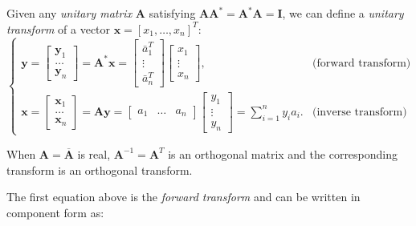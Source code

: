 \documentclass[10pt,b5paper,titlepage]{book}
\begin{document}
Given any \textit{unitary matrix} $\mathbf{A}$ satisfying $\mathbf{A} \mathbf{A}^{*} = \mathbf{A}^{*} \mathbf{A} = \mathbf{I}$, we can define a \textit{unitary transform} of a vector $\mathbf{x} = [x_{1}, \dots, x_{n}]^{T}$:
\begin{equation}
\left\{
    \begin{array}{lr}
        \mathbf{y}
        = \begin{bmatrix}
            \mathbf{y}_{1}\\
            \dots\\
            \mathbf{y}_{n}
        \end{bmatrix}
        = \mathbf{A}^{*} \mathbf{x}
        = \begin{bmatrix}
             \bar{a}_{1}^{T} \\
             \vdots  \\
             \bar{a}_{n}^{T}
        \end{bmatrix}
        \begin{bmatrix}
            x_{1}\\
            \vdots \\
            x_{n}
        \end{bmatrix}, & \text{(forward transform)}\\

        \mathbf{x}
        = \begin{bmatrix}
            \mathbf{x}_{1}\\
            \dots\\
            \mathbf{x}_{n}
        \end{bmatrix}
        = \mathbf{A} \mathbf{y}
        = \begin{bmatrix}
            a_{1} & \dots & a_{n}
        \end{bmatrix}
        \begin{bmatrix}
            y_{1}\\
            \vdots\\
            y_{n}
        \end{bmatrix}
        = \sum_{i=1}^{n} y_{i} a_{i}. & \text{(inverse transform)}
\end{array}
\right.
\end{equation}

When $\mathbf{A} = \overline{\mathbf{A}}$ is real, $\mathbf{A}^{-1} = \mathbf{A}^{T}$ is an
orthogonal matrix and the corresponding transform is an orthogonal transform.

The first equation above is the \textit{forward transform} and can be written
in component form as:
\end{document}
